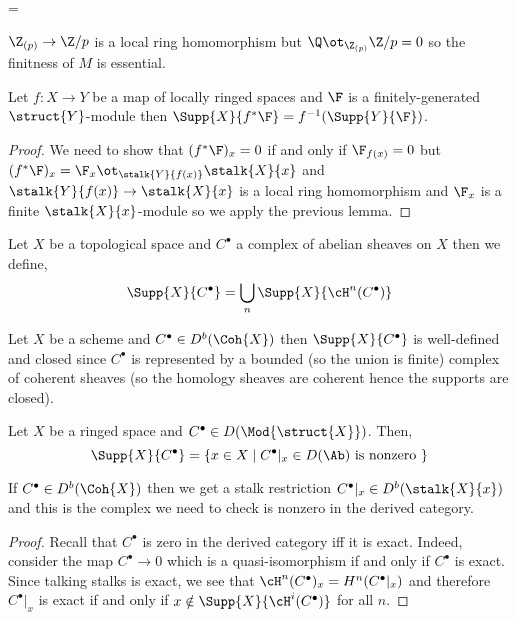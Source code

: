 =\documentclass[12pt]{article}
\begin{document}
\begin{example}
$\Z_{(p)} \to \Z / p$ is a local ring homomorphism but $\Q \ot_{\Z_{(p)}} \Z / p = 0$ so the finitness of $M$ is essential.
\end{example}

\begin{prop}
Let $f : X \to Y$ be a map of locally ringed spaces and $\F$ is a finitely-generated $\struct{Y}$-module then $\Supp{X}{f^* \F} = f^{-1}(\Supp{Y}{\F})$.
\end{prop}

\begin{proof}
We need to show that $(f^* \F)_x = 0$ if and only if $\F_{f(x)} = 0$ but $(f^* \F)_x = \F_x \ot_{\stalk{Y}{f(x)}} \stalk{X}{x}$ and $\stalk{Y}{f(x)} \to \stalk{X}{x}$ is a local ring homomorphism and $\F_x$ is a finite $\stalk{X}{x}$-module so we apply the previous lemma.
\end{proof}

\begin{defn}
Let $X$ be a topological space and $C^\bullet$ a complex of abelian sheaves on $X$ then we define,
\[ \Supp{X}{C^\bullet} = \bigcup_n \Supp{X}{\cH^n(C^\bullet)} \]
\end{defn}

\begin{rmk}
Let $X$ be a scheme and $C^\bullet \in D^b(\Coh{X})$ then $\Supp{X}{C^\bullet}$ is well-defined and closed since $C^\bullet$ is represented by a bounded (so the union is finite) complex of coherent sheaves (so the homology sheaves are coherent hence the supports are closed).
\end{rmk}

\begin{prop}
Let $X$ be a ringed space and $C^\bullet \in D(\Mod{\struct{X}})$. Then,
\[ \Supp{X}{C^\bullet} = \{ x \in X \mid C^\bullet|_x \in D(\Ab) \text{ is nonzero } \} \]
\end{prop}

\begin{rmk}
If $C^\bullet \in D^b(\Coh{X})$ then we get a stalk restriction $C^\bullet|_x \in D^b(\stalk{X}{x})$ and this is the complex we need to check is nonzero in the derived category.
\end{rmk}

\begin{proof}
Recall that $C^\bullet$ is zero in the derived category iff it is exact. Indeed, consider the map $C^\bullet \to 0$ which is a quasi-isomorphism if and only if $C^\bullet$ is exact. Since talking stalks is exact, we see that $\cH^n(C^\bullet)_x = H^n(C^\bullet|_x)$ and therefore $C^\bullet|_x$ is exact if and only if $x \notin \Supp{X}{\cH^i(C^\bullet)}$ for all $n$.
\end{proof}
\end{document}
